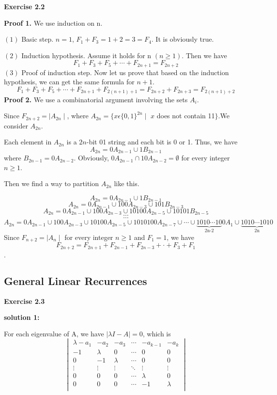 \documentclass{article} %
\begin{document}
	\textbf{Exercise 2.2}\par
	\textbf{Proof 1.} We use induction on n.\par
	$(1)$ Basic step. $n=1$, $F_1+F_3=1+2=3=F_4$. It is obviously true.\par
	$(2)$ Induction hypothesis. Assume it holds for n $(n \ge 1)$. Then we have
	$$
	F_1+F_3+F_5+\cdots+F_{2n+1}=F_{2n+2}
	$$
	$(3)$ Proof of induction step. Now let us prove that based on the induction hypothesis, we can get the same formula for $n+1$.
	$$
	F_1+F_3+F_5+\cdots+F_{2n+1}+F_{2(n+1)+1}=F_{2n+2}+F_{2n+3}=F_{2(n+1)+2}
	$$
	\textbf{Proof 2.} We use a combinatorial argument involving the sets $A_i$.\par
	Since $F_{2n+2}=\mid A_{2n} \mid$, where $A_{2n} = \{x\epsilon{\{0,1\}}^{2n}\mid$ $x$ does not contain 11$\}$.We consider $A_{2n}$.\par
	Each element in $A_{2n}$ is a  $2n$-bit 01 string and each bit is 0 or 1. Thus, we have
	$$
	A_{2n}=0A_{2n-1}\cup1B_{2n-1}
	$$
	where $B_{2n-1}=0A_{2n-2}$. Obviously, $0A_{2n-1}\cap10A_{2n-2}=\emptyset$ for every integer $n \ge 1$.\par
	Then we find a way to partition $A_{2n}$ like this.\par
	$$ A_{2n}=0A_{2n-1}\cup1B_{2n-1}$$
	$$A_{2n}=0A_{2n-1}\cup100A_{2n-3}\cup101B_{2n-3}$$
	$$A_{2n}=0A_{2n-1}\cup100A_{2n-3}\cup10100A_{2n-5}\cup10101B_{2n-5}$$
	$$\cdots$$
	$$\cdots$$
	$$A_{2n}=0A_{2n-1}\cup100A_{2n-3}\cup10100A_{2n-5}\cup1010100A_{2n-7}\cup\cdots\cup\underbrace{1010\cdots10}_{\text{2n-2}}0A_1\cup\underbrace{1010\cdots1010}_{\text{2n}}$$
	Since $F_{n+2}=\mid A_{n} \mid$ for every integer $n\ge1$ and $F_1=1$, we have
	$$
	F_{2n+2}=F_{2n+1}+F_{2n-1}+F_{2n-3}+\cdot+F_3+F_1
	$$.
	\subsection{General Linear Recurrences}
	\textbf{Exercise 2.3}\par
	\textbf{solution 1:}\par
	For each eigenvalue of A, we have $|\lambda I-A|=0$, which is
	$$
 \begin{vmatrix}
   \lambda -a_1 & -a_2 & -a_3 & \cdots &-a_{k-1} & -a_k \\
   -1 & \lambda & 0 & \cdots & 0 & 0 \\
   0 & -1 & \lambda & \cdots & 0 & 0 \\
   \vdots & \vdots & \vdots & \ddots & \vdots & \vdots \\
   0 & 0 & 0 & \cdots & \lambda & 0\\
   0 & 0 & 0 & \cdots & -1 & \lambda\\
  \end{vmatrix}
$$
\end{document}
